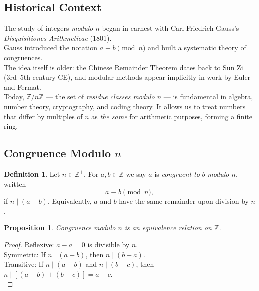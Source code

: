 \documentclass[12pt]{article}
\newtheorem{proposition}[theorem]{Proposition}
\theoremstyle{definition}
\newtheorem{definition}{Definition}
\begin{document}
\subsection*{Historical Context}


The study of integers \emph{modulo $n$} began in earnest with Carl Friedrich Gauss's \emph{Disquisitiones Arithmeticae} (1801).  \\

\noindent
Gauss introduced the notation $a \equiv b \pmod{n}$ and built a systematic theory of congruences.  \\

\noindent
The idea itself is older: the Chinese Remainder Theorem dates back to Sun Zi (3rd–5th century CE), and modular methods appear implicitly in work by Euler and Fermat.\\

\noindent
Today, $\mathbb{Z}/n\mathbb{Z}$ — the set of \emph{residue classes modulo $n$} — is fundamental in algebra, number theory, cryptography, and coding theory.  
\noindent
It allows us to treat numbers that differ by multiples of $n$ as \emph{the same} for arithmetic purposes, forming a finite ring.

\newpage

\subsection*{Congruence Modulo $n$}

\begin{definition}
Let $n \in \mathbb{Z}^+$. For $a,b\in\mathbb{Z}$ we say $a$ is \emph{congruent to} $b$ \emph{modulo $n$}, written
\[
a \equiv b \pmod{n},
\]
if $n \mid (a-b)$. Equivalently, $a$ and $b$ have the same remainder upon division by $n$.
\end{definition}

\dotfill

\begin{proposition}
Congruence modulo $n$ is an equivalence relation on $\mathbb{Z}$.
\end{proposition}

\vspace{1em}

\begin{proof}
Reflexive: $a-a=0$ is divisible by $n$.  \\

\noindent
Symmetric: If $n\mid(a-b)$, then $n\mid(b-a)$. \\

\noindent
Transitive: If $n\mid(a-b)$ and $n\mid(b-c)$, then $n\mid[(a-b)+(b-c)]=a-c$.\\
\end{proof}
\end{document}
